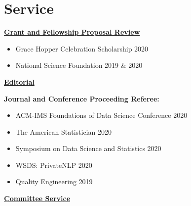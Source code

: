 \documentclass[11pt, letterpaper, roman]{moderncv} %
\begin{document}
\section{Service}

\underline{\textbf{\large Grant and Fellowship Proposal Review}}\normalsize

\vspace{4pt}
\begin{itemize}
    \item Grace Hopper Celebration Scholarship \hfill 2020
    \item National Science Foundation \hfill 2019 \& 2020
\end{itemize}

\vspace{4pt}
\underline{\textbf{\large Editorial}}\normalsize

\textbf{Journal and Conference Proceeding Referee:} 
    \begin{itemize}
        \item ACM-IMS Foundations of Data Science Conference \hfill 2020
        \item The American Statistician \hfill 2020
        \item Symposium on Data Science and Statistics \hfill 2020
        \item WSDS: PrivateNLP \hfill 2020
        \item Quality Engineering \hfill 2019
    \end{itemize}

\newpage
\underline{\textbf{\large Committee Service}}\normalsize


\vspace{2pt}
\end{document}
